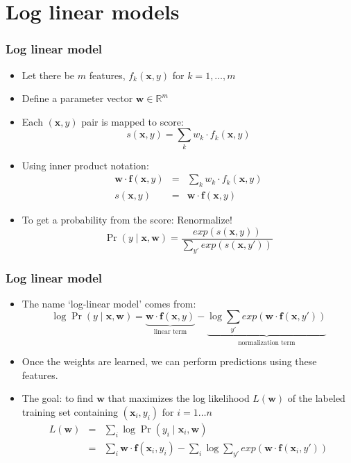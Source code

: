 \section{Log linear models}
\frame{\tableofcontents[currentsection]}

\begin{frame}
\frametitle{Log linear model}
\begin{itemize}[<+->]
\item Let there be $m$ features, $f_k(\textbf{x}, y)$ for $k = 1, \ldots, m$
\item Define a parameter vector $\textbf{w} \in \mathbb{R}^m$
\item Each $(\textbf{x}, y)$ pair is mapped to score:
\[ s(\textbf{x}, y) = \sum_k w_k \cdot f_k(\textbf{x}, y) \]
\item Using inner product notation:
\begin{eqnarray*}
\textbf{w} \cdot \textbf{f}(\textbf{x}, y) & = & \sum_k w_k \cdot f_k(\textbf{x}, y) \\
s(\textbf{x}, y) & = & \textbf{w} \cdot \textbf{f}(\textbf{x}, y) 
\end{eqnarray*}
\item To get a probability from the score: Renormalize! 
\[ \Pr(y \mid \textbf{x}, \textbf{w}) = \frac{exp\left(s(\textbf{x}, y)\right)}{\sum_{y'} exp\left(s(\textbf{x}, y')\right)} \]
\end{itemize}
\end{frame}

\begin{frame}
\frametitle{Log linear model}
\begin{itemize}[<+->]
\item The name `log-linear model' comes from:
\[ \log \Pr(y \mid \textbf{x}, \textbf{w}) = \underbrace{\textbf{w} \cdot \textbf{f}(\textbf{x}, y)}_{\textrm{linear term}} - \underbrace{\log \sum_{y'} exp\left( \textbf{w} \cdot \textbf{f}(\textbf{x}, y') \right)}_{\textrm{normalization term}} \]
\item Once the weights are learned, we can perform predictions using these features.
\item The goal: to find $\textbf{w}$ that maximizes the log likelihood $L(\textbf{w})$ of the labeled training set containing $(\textbf{x}_i, y_i)$ for $i = 1 \ldots n$
\begin{eqnarray*}
L(\textbf{w}) &=& \sum_{i} \log \Pr(y_i \mid \textbf{x}_i, \textbf{w}) \\
&=& \sum_i \textbf{w} \cdot \textbf{f}(\textbf{x}_i, y_i) - \sum_i \log \sum_{y'} exp\left( \textbf{w} \cdot \textbf{f}(\textbf{x}_i, y') \right) 
\end{eqnarray*}
\end{itemize}
\end{frame}

